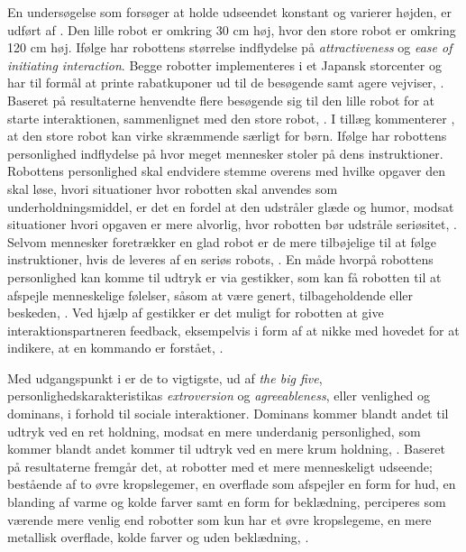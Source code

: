 En undersøgelse som forsøger at holde udseendet konstant og varierer højden, er udført af \textcite[s. 255]{PDF:RecommendationEffects}. Den lille robot er omkring 30 cm høj, hvor den store robot er omkring 120 cm høj. Ifølge \textcite[s. 255]{PDF:RecommendationEffects} har robottens størrelse indflydelse på \textit{attractiveness} og \textit{ease of initiating interaction}. Begge robotter implementeres i et Japansk storcenter og har til formål at printe rabatkuponer ud til de besøgende samt agere vejviser, \textcite[s. 252]{PDF:RecommendationEffects}. Baseret på resultaterne henvendte flere besøgende sig til den lille robot for at starte interaktionen, sammenlignet med den store robot, \parencite[s. 260]{PDF:RecommendationEffects}. I tillæg kommenterer \textcite[s. 260]{PDF:RecommendationEffects}, at den store robot kan virke skræmmende særligt for børn.\blankline
%
Ifølge \textcite[s. 226]{PDF:SocailAndCollaborative} har robottens personlighed indflydelse på hvor meget mennesker stoler på dens instruktioner. Robottens personlighed skal endvidere stemme overens med hvilke opgaver den skal løse, hvori situationer hvor robotten skal anvendes som underholdningsmiddel, er det en fordel at den udstråler glæde og humor, modsat situationer hvori opgaven er mere alvorlig, hvor robotten bør udstråle seriøsitet, \parencite[s. 226]{PDF:SocailAndCollaborative}. Selvom mennesker foretrækker en glad robot er de mere tilbøjelige til at følge instruktioner, hvis de leveres af en seriøs robots, \parencite[s. 226]{PDF:SocailAndCollaborative}. En måde hvorpå robottens personlighed kan komme til udtryk er via gestikker, som kan få robotten til at afspejle menneskelige følelser, såsom at være genert, tilbageholdende eller beskeden, \parencite[s. 227]{PDF:SocailAndCollaborative}. Ved hjælp af gestikker er det muligt for robotten at give interaktionspartneren feedback, eksempelvis i form af at nikke med hovedet for at indikere, at en kommando er forstået, \parencite[s. 228]{PDF:SocailAndCollaborative}.

Med udgangspunkt i \textcite[s. 272]{PDF:PersonalityOfSocialRobots} er de to vigtigste, ud af \textit{the big five}, personlighedskarakteristikas \textit{extroversion} og \textit{agreeableness}, eller venlighed og dominans, i forhold til sociale interaktioner. Dominans kommer blandt andet til udtryk ved en ret holdning, modsat en mere underdanig personlighed, som kommer blandt andet kommer til udtryk ved en mere krum holdning, \textcite[s. 273]{PDF:PersonalityOfSocialRobots}. Baseret på resultaterne fremgår det, at robotter med et mere menneskeligt udseende; bestående af to øvre kropslegemer, en overflade som afspejler en form for hud, en blanding af varme og kolde farver samt en form for beklædning, perciperes som værende mere venlig end robotter som kun har et øvre kropslegeme, en mere metallisk overflade, kolde farver og uden beklædning, \textcite[s. 275]{PDF:PersonalityOfSocialRobots}.

